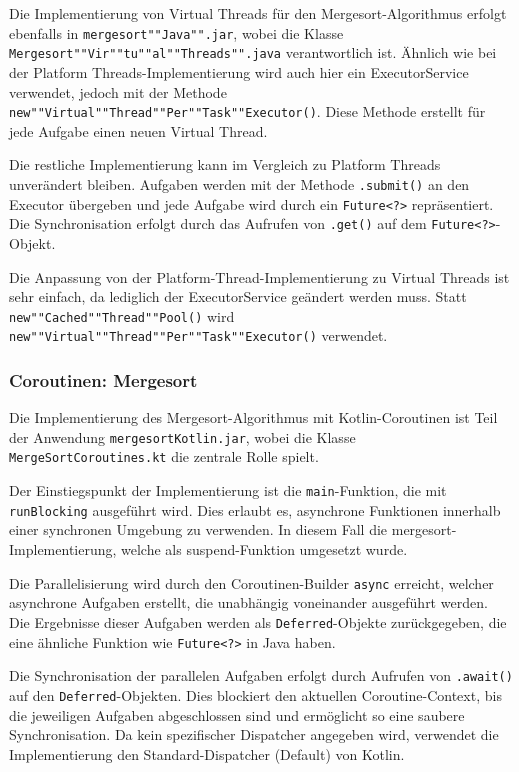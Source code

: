 \documentclass[fontsize=12pt,paper=a4,twoside=semi,parskip=half-,headsepline,headinclude]{scrreprt}
\begin{document}
Die Implementierung von Virtual Threads für den Mergesort-Algorithmus erfolgt ebenfalls in \texttt{mergesort""Java"".jar}, wobei die Klasse \texttt{Mergesort""Vir""tu""al""Threads"".java} verantwortlich ist. Ähnlich wie bei der Platform Threads-Implementierung wird auch hier ein ExecutorService verwendet, jedoch mit der Methode \texttt{new""Virtual""Thread""Per""Task""Executor()}. Diese Methode erstellt für jede Aufgabe einen neuen Virtual Thread.

Die restliche Implementierung kann im Vergleich zu Platform Threads unverändert bleiben. Aufgaben werden mit der Methode \texttt{.submit()} an den Executor übergeben und jede Aufgabe wird durch ein \texttt{Future<?>} repräsentiert. Die Synchronisation erfolgt durch das Aufrufen von \texttt{.get()} auf dem \texttt{Future<?>}-Objekt.

Die Anpassung von der Platform-Thread-Implementierung zu Virtual Threads ist sehr einfach, da lediglich der ExecutorService geändert werden muss. Statt \texttt{new""Cached""Thread""Pool()} wird \texttt{new""Virtual""Thread""Per""Task""Executor()} verwendet.

\subsubsection{Coroutinen: Mergesort}

Die Implementierung des Mergesort-Algorithmus mit Kotlin-Coroutinen ist Teil der Anwendung \texttt{mergesortKotlin.jar}, wobei die Klasse \texttt{MergeSortCoroutines.kt} die zentrale Rolle spielt.

Der Einstiegspunkt der Implementierung ist die \texttt{main}-Funktion, die mit \texttt{runBlocking} ausgeführt wird. Dies erlaubt es, asynchrone Funktionen innerhalb einer synchronen Umgebung zu verwenden. In diesem Fall die mergesort-Implementierung, welche als suspend-Funktion umgesetzt wurde.

Die Parallelisierung wird durch den Coroutinen-Builder \texttt{async} erreicht, welcher asynchrone Aufgaben erstellt, die unabhängig voneinander ausgeführt werden. Die Ergebnisse dieser Aufgaben werden als \texttt{Deferred}-Objekte zurückgegeben, die eine ähnliche Funktion wie \texttt{Future<?>} in Java haben.

Die Synchronisation der parallelen Aufgaben erfolgt durch Aufrufen von \texttt{.await()} auf den \texttt{Deferred}-Objekten. Dies blockiert den aktuellen Coroutine-Context, bis die jeweiligen Aufgaben abgeschlossen sind und ermöglicht so eine saubere Synchronisation. Da kein spezifischer Dispatcher angegeben wird, verwendet die Implementierung den Standard-Dispatcher (Default) von Kotlin.
\end{document}
